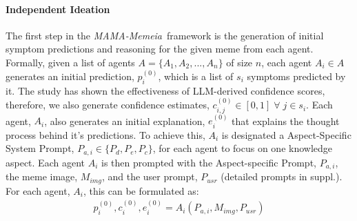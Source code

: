 \documentclass[letterpaper]{article} %
\newcommand{\model}{\textit{MAMA-Memeia}}
\begin{document}
\paragraph{\textbf{Independent Ideation}} 
The first step in the \model\ framework is the generation of initial symptom predictions and reasoning for the given meme from each agent.
Formally, given a list of agents $A = \{A_1, A_2, ...,A_n\}$ of size $n$,
each agent $A_i \in A$ generates an initial prediction, $p_{i}^{(0)}$, which is a list of $s_i$ symptoms predicted by it. 
The study \cite{xiong2024can} has shown the effectiveness of LLM-derived confidence scores, therefore, we also generate confidence estimates, $c_{i,j}^{(0)} \in [0, 1] \;\forall\; j \in s_i$.
Each agent, $A_i$, also generates an initial explanation, $e_i^{(0)}$ that explains the thought process behind it's predictions. To achieve this, $A_i$ is designated a Aspect-Specific System Prompt, $P_{a,i} \in \{P_d, P_e, P_c\}$, for each agent to focus on one knowledge aspect.  
Each agent $A_i$ is then prompted with the Aspect-specific Prompt, $P_{a,i}$, the meme image, $M_{img}$, and the user prompt, $P_{usr}$ (detailed prompts in suppl.). For each agent, $A_i$, this can be formulated as:
\begin{equation}
    \begin{aligned}
    p_{i}^{(0)}, c_i^{(0)}, e_i^{(0)} = A_i({P}_{a,i}, M_{img}, P_{usr}) \\
    \end{aligned}
\end{equation}
\end{document}
